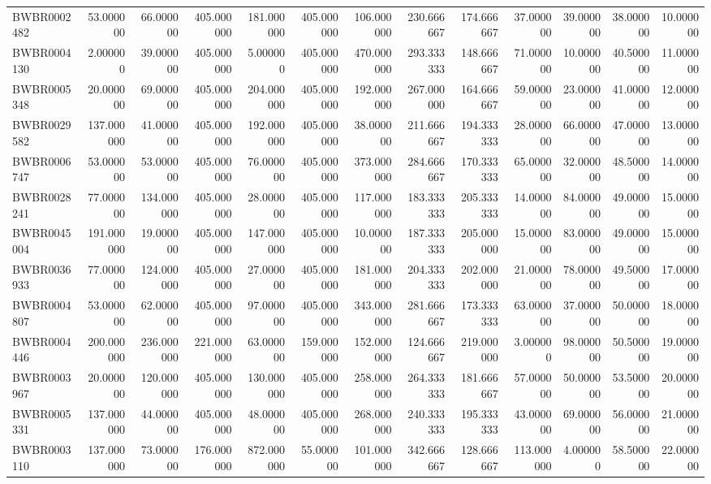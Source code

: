 \begin{longtable}{lrrrrrrrrrrrr}
BWBR0002482 & 53.000000 & 66.000000 & 405.000000 & 181.000000 & 405.000000 & 106.000000 & 230.666667 & 174.666667 & 37.000000 & 39.000000 & 38.000000 & 10.000000 \\
BWBR0004130 & 2.000000 & 39.000000 & 405.000000 & 5.000000 & 405.000000 & 470.000000 & 293.333333 & 148.666667 & 71.000000 & 10.000000 & 40.500000 & 11.000000 \\
BWBR0005348 & 20.000000 & 69.000000 & 405.000000 & 204.000000 & 405.000000 & 192.000000 & 267.000000 & 164.666667 & 59.000000 & 23.000000 & 41.000000 & 12.000000 \\
BWBR0029582 & 137.000000 & 41.000000 & 405.000000 & 192.000000 & 405.000000 & 38.000000 & 211.666667 & 194.333333 & 28.000000 & 66.000000 & 47.000000 & 13.000000 \\
BWBR0006747 & 53.000000 & 53.000000 & 405.000000 & 76.000000 & 405.000000 & 373.000000 & 284.666667 & 170.333333 & 65.000000 & 32.000000 & 48.500000 & 14.000000 \\
BWBR0028241 & 77.000000 & 134.000000 & 405.000000 & 28.000000 & 405.000000 & 117.000000 & 183.333333 & 205.333333 & 14.000000 & 84.000000 & 49.000000 & 15.000000 \\
BWBR0045004 & 191.000000 & 19.000000 & 405.000000 & 147.000000 & 405.000000 & 10.000000 & 187.333333 & 205.000000 & 15.000000 & 83.000000 & 49.000000 & 15.000000 \\
BWBR0036933 & 77.000000 & 124.000000 & 405.000000 & 27.000000 & 405.000000 & 181.000000 & 204.333333 & 202.000000 & 21.000000 & 78.000000 & 49.500000 & 17.000000 \\
BWBR0004807 & 53.000000 & 62.000000 & 405.000000 & 97.000000 & 405.000000 & 343.000000 & 281.666667 & 173.333333 & 63.000000 & 37.000000 & 50.000000 & 18.000000 \\
BWBR0004446 & 200.000000 & 236.000000 & 221.000000 & 63.000000 & 159.000000 & 152.000000 & 124.666667 & 219.000000 & 3.000000 & 98.000000 & 50.500000 & 19.000000 \\
BWBR0003967 & 20.000000 & 120.000000 & 405.000000 & 130.000000 & 405.000000 & 258.000000 & 264.333333 & 181.666667 & 57.000000 & 50.000000 & 53.500000 & 20.000000 \\
BWBR0005331 & 137.000000 & 44.000000 & 405.000000 & 48.000000 & 405.000000 & 268.000000 & 240.333333 & 195.333333 & 43.000000 & 69.000000 & 56.000000 & 21.000000 \\
BWBR0003110 & 137.000000 & 73.000000 & 176.000000 & 872.000000 & 55.000000 & 101.000000 & 342.666667 & 128.666667 & 113.000000 & 4.000000 & 58.500000 & 22.000000 \\

\end{longtable}
